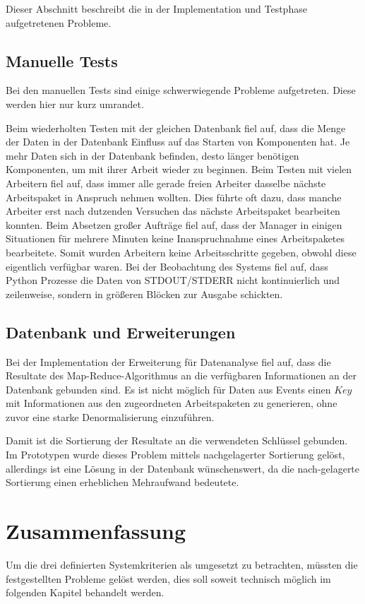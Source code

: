 Dieser Abschnitt  beschreibt die in der Implementation und Testphase aufgetretenen Probleme.

\subsection{Manuelle Tests}

Bei den manuellen Tests sind einige schwerwiegende Probleme aufgetreten.
Diese werden hier nur kurz umrandet.

\begin{itemize}
        Beim wiederholten Testen mit der gleichen Datenbank fiel auf,
        dass die Menge der Daten in der Datenbank Einfluss auf das Starten von Komponenten hat.
        Je mehr Daten sich in der Datenbank befinden, desto länger benötigen Komponenten,
        um mit ihrer Arbeit wieder zu beginnen.
        Beim Testen mit vielen Arbeitern fiel auf, dass immer alle gerade freien Arbeiter
        dasselbe nächste Arbeitspaket in Anspruch nehmen wollten. Dies führte oft dazu,
        dass manche Arbeiter erst nach dutzenden Versuchen das nächste Arbeitspaket bearbeiten konnten.
        Beim Absetzen großer Aufträge fiel auf, dass der Manager in einigen Situationen
        für mehrere Minuten keine Inanspruchnahme eines Arbeitspaketes bearbeitete.
        Somit wurden Arbeitern keine Arbeitsschritte gegeben, obwohl diese eigentlich verfügbar waren.
        Bei der Beobachtung des Systems fiel auf, dass Python Prozesse
        die Daten von STDOUT/STDERR nicht kontinuierlich und zeilenweise,
        sondern in größeren Blöcken zur Ausgabe schickten.
\end{itemize}


\subsection{Datenbank und Erweiterungen}

Bei der Implementation der Erweiterung für Datenanalyse fiel auf,
dass die Resultate des Map-Reduce-Algorithmus an die verfügbaren Informationen an der Datenbank gebunden sind.
Es ist nicht möglich für Daten aus Events einen $Key$ mit Informationen aus den zugeordneten Arbeitspaketen zu generieren, ohne zuvor eine starke Denormalisierung einzuführen.

Damit ist die Sortierung der Resultate an die verwendeten Schlüssel gebunden. 
Im Prototypen wurde dieses Problem mittels nachgelagerter Sortierung gelöst,
allerdings ist eine Lösung in der Datenbank wünschenswert, da die nach-gelagerte Sortierung einen erheblichen Mehraufwand bedeutete.


\section{Zusammenfassung}
\label{sec:eval:zusammenfassung}
Um die drei definierten Systemkriterien als umgesetzt zu betrachten,
müssten die festgestellten Probleme gelöst werden,
dies soll soweit technisch möglich im folgenden Kapitel behandelt werden.

